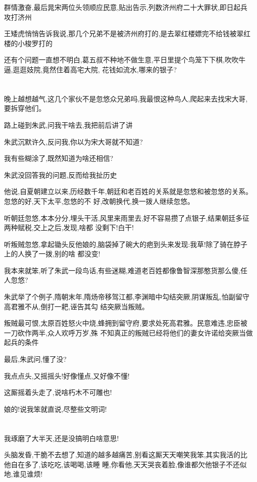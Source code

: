 ﻿\documentclass[12pt]{article}
\begin{document}
群情激奋,最后晁宋两位头领顺应民意,贴出告示,列数济州府二十大罪状,即日起兵攻打济州\dldots

王矮虎悄悄告诉我说,那几个兄弟不是被济州府打的,是去翠红楼嫖完不给钱被翠红楼的小梭罗打的\dldots

还有个问题一直想不明白,葛五叔不种地不做生意,平日里提个鸟笼下下棋,吹吹牛逼,逛逛妓院,竟然住着高宅大院,
花钱如流水,哪来的银子?
\section{}

晚上越想越气,这几个家伙不是忽悠众兄弟吗,我最恨这种鸟人,爬起来去找宋大哥,要拆穿他们。

路上碰到朱武,问我干啥去,我把前后讲了讲

朱武沉默许久,反问我,你以为宋大哥就不知道?

我有些糊涂了,既然知道为啥还相信?

朱武没回答我的问题,反而给我扯历史

他说,自夏朝建立以来,历经数千年,朝廷和老百姓的关系就是忽悠和被忽悠的关系。忽悠的好,天下太平,忽悠的不
好,改朝换代,换一拨人继续忽悠。

听朝廷忽悠,本本分分,埋头干活,风里来雨里去,好不容易攒了点银子,结果朝廷多征两种赋税,交上之后,发现,啥都
没剩下!白干!

听叛贼忽悠,拿起锄头反他娘的,脑袋掉了碗大的疤\dldots 到头来发现:我草!除了骑在脖子上的人换了一拨,别的啥
都没变!

我本来就笨,听了朱武一段鸟话,有些迷糊,难道老百姓都像鲁智深那憨货那么傻,任人忽悠?

朱武举了个例子,隋朝末年,隋炀帝移驾江都,李渊暗中勾结突厥,阴谋叛乱,怕副留守高君雅不从,倒打一耙,诬告其勾
结突厥当叛贼。

叛贼最可恨,太原百姓怒火中烧,蜂拥到留守府,要求处死高君雅。民意难违,忠臣被一刀砍作两半,众人欢呼万岁,殊
不知真正的叛贼已经将他们的妻女许诺给突厥当做起兵的条件\dldots

最后,朱武问,懂了没?

我点点头,又摇摇头!好像懂点,又好像不懂!

这厮摇着头走了,说啥朽木不可雕也!

娘的!说我笨就直说,尽整些文明词! 

\section{}

我琢磨了大半天,还是没搞明白啥意思!

头脑发昏,干脆不去想了,知道的越多越痛苦,别看这厮天天嘲笑我笨,其实我活的比他自在多了,该吃吃,该喝喝,该睡
睡,你看他,天天哭丧着脸,像谁都欠他银子不还似地,谁见谁烦!
\end{document}
